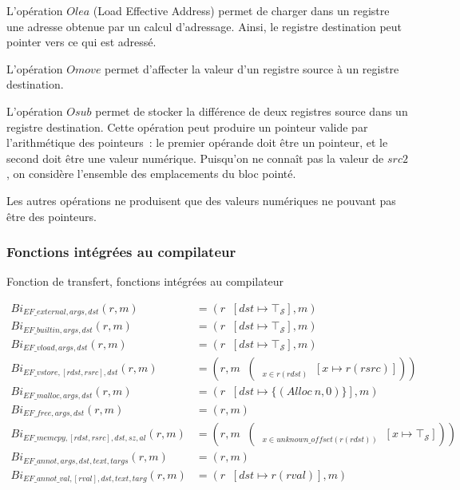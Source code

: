 \documentclass{article}
\newcommand\mi{\mathit}
\newcommand\Bi[1]{Bi_{\mi{#1}}}
\newcommand\tS{\mathcal{S}}
\newcommand\tR{\mathcal{R}}
\newcommand\tM{\mathcal{M}}
\DeclareMathOperator*{\lubR}{{\sqcup}_\tR}
\DeclareMathOperator*{\lubM}{{\sqcup}_\tM}
\DeclareMathOperator*{\LUBM}{{\bigsqcup}_\tM}
\begin{document}
L'opération $Olea$ (Load Effective Address) permet de charger dans un
registre une adresse obtenue par un calcul d'adressage. Ainsi, le registre
destination peut pointer vers ce qui est adressé.

L'opération $Omove$ permet d'affecter la valeur d'un registre source
à un registre destination.

L'opération $Osub$ permet de stocker la différence de deux registres
source dans un registre destination. Cette opération peut produire un pointeur
valide par l'arithmétique des pointeurs~: le premier opérande doit être un
pointeur, et le second doit être une valeur numérique. Puisqu'on ne connaît pas
la valeur de $\mi{src2}$, on considère l'ensemble des emplacements du bloc
pointé.

Les autres opérations ne produisent que des valeurs numériques ne pouvant pas
être des pointeurs.

\newpage

\subsubsection*{Fonctions intégrées au compilateur}

\begin{formulae}
\caption{Fonction de transfert, fonctions intégrées au compilateur}
\label{transf_builtin}
\begin{align*}
\Bi{EF\_external, args, dst}(r, m) &=
(r \lubR [dst \mapsto \top_\tS], m)
\\
\Bi{EF\_builtin, args, dst}(r, m) &=
(r \lubR [dst \mapsto \top_\tS], m)
\\
\Bi{EF\_vload, args, dst}(r, m) &=
(r \lubR [dst \mapsto \top_\tS], m)
\\
\Bi{EF\_vstore, [rdst, rsrc], dst}(r, m) &=
(r, m \lubM (\LUBM_{\substack{x \in r(\mi{rdst})}}
[x \mapsto r(\mi{rsrc})]))
\\
\Bi{EF\_malloc, args, dst}(r, m) &=
(r \lubR [dst \mapsto \{(\mi{Alloc}\ n, 0)\}], m)
\\
\Bi{EF\_free, args, dst}(r, m) &= (r, m)
\\
\Bi{EF\_memcpy, [rdst, rsrc], dst, sz, al}(r, m) &=
(r, m \lubM (\LUBM_{\substack{x \in
\mi{unknown\_offset}(r(\mi{rdst}))}} [x \mapsto \top_\tS]))
\\
\Bi{EF\_annot, args, dst, text, targs}(r, m) &= (r, m)
\\
\Bi{EF\_annot\_val, [rval], dst, text, targ}(r, m) &=
(r \lubR [\mi{dst} \mapsto r(\mi{rval})], m)
\end{align*}
\end{formulae}
\end{document}

